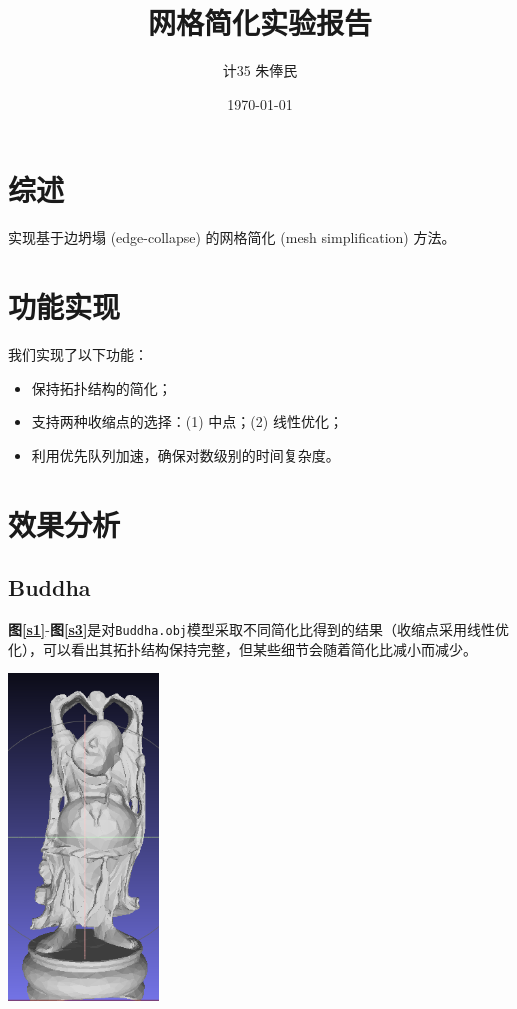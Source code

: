 \documentclass[11pt, a4paper]{article}
\title{\hei 网格简化实验报告}
\author{\kai \quad 计35 \quad 朱俸民 \quad 2012011894}
\date{\kai \today}
\makeatletter
\newcommand\fcaption{\def\@captype{figure}\caption}
\newcommand{\fref}[1]{\textbf{图\ref{#1}}}
\makeatother
\begin{document}
\maketitle

\section{综述}

实现基于边坍塌 (edge-collapse) 的网格简化 (mesh simplification) 方法。

\section{功能实现}

我们实现了以下功能：

\begin{itemize}
    \item 保持拓扑结构的简化；
    \item 支持两种收缩点的选择：(1) 中点；(2) 线性优化；
    \item 利用优先队列加速，确保对数级别的时间复杂度。
\end{itemize}

\section{效果分析}

\subsection{Buddha}

\fref{s1}-\fref{s3}是对\texttt{Buddha.obj}模型采取不同简化比得到的结果（收缩点采用线性优化），可以看出其拓扑结构保持完整，但某些细节会随着简化比减小而减少。

\begin{center}
    \includegraphics[width=4cm]{../output/buddha0.1.png}
    \fcaption{简化比0.1}\label{s1}
\end{center}
\end{document}

